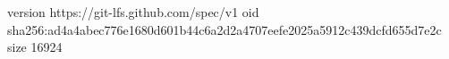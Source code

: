 version https://git-lfs.github.com/spec/v1
oid sha256:ad4a4abec776e1680d601b44c6a2d2a4707eefe2025a5912c439dcfd655d7e2c
size 16924
